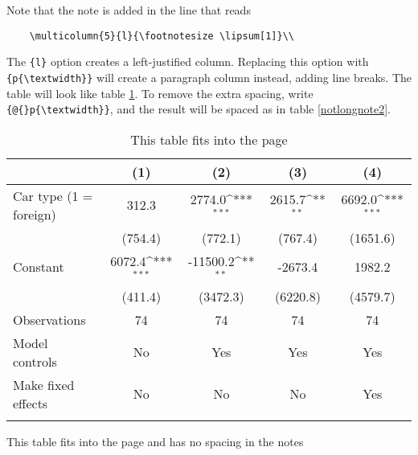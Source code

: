 \documentclass[11pt,a4paper]{article}
\begin{document}
Note that the note is added in the line that reads 

\begin{verbatim}
	\multicolumn{5}{l}{\footnotesize \lipsum[1]}\\
\end{verbatim}

The \texttt{\{l\}} option creates a left-justified column. Replacing this option with \texttt{\{p\{\textbackslash textwidth\}\}} will create a paragraph column instead, adding line breaks. The table will look like table \ref{notlongnote}. To remove the extra spacing, write \texttt{\{@\{\}p\{\textbackslash textwidth\}\}}, and the result will be spaced as in table \ref{notlongnote2}.


\begin{table}[H]
	\caption{This table fits into the page}
	\label{notlongnote}
{
	\def\sym#1{\ifmmode^{#1}\else\(^{#1}\)\fi}
	\begin{tabular}{l*{4}{c}}
		\hline\hline
		&\multicolumn{1}{c}{(1)}         &\multicolumn{1}{c}{(2)}         &\multicolumn{1}{c}{(3)}         &\multicolumn{1}{c}{(4)}         \\
		\hline
		Car type (1 = foreign)     &    312.3         &   2774.0\sym{***}&   2615.7\sym{**} &   6692.0\sym{***}\\
		&  (754.4)         &  (772.1)         &  (767.4)         & (1651.6)         \\
		[1em]
		Constant        &   6072.4\sym{***}& -11500.2\sym{**} &  -2673.4         &   1982.2         \\
		&  (411.4)         & (3472.3)         & (6220.8)         & (4579.7)         \\
		\hline
		Observations    &       74         &       74         &       74         &       74         \\
		Model controls  &       No         &      Yes         &      Yes         &      Yes         \\
		Make fixed effects&       No         &       No         &       No         &      Yes         \\
		\hline\hline \multicolumn{5}{p{\textwidth}}{\footnotesize \lipsum[1] }\\ \end{tabular}}
\end{table}

\begin{table}[H]
	\caption{This table fits into the page and has no spacing in the notes}
	\label{notlongnote2}
		
\end{table}
\end{document}

